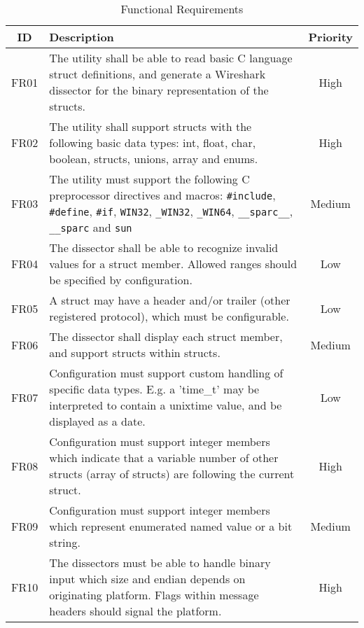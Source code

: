 \begin{table}[ht] \center
\caption{Functional Requirements\label{tab:funcreq}}
\begin{tabular}{| c | p{9cm} | c |}
	\hline ID & Description & Priority \\
    \hline FR01 & The utility shall be able to read basic C language struct
		definitions, and generate a Wireshark dissector for the binary
		representation of the structs. & High \\
	\hline FR02 & The utility shall support structs with the following basic
		data types: int, float, char, boolean, structs, unions, array and
		enums. & High \\
	\hline FR03 & The utility must support the following C preprocessor
		directives and macros: \verb+#include+, \verb+#define+, \verb+#if+,
		\verb+WIN32+, \verb+_WIN32+, \verb+_WIN64+, \verb+__sparc__+,
		\verb+__sparc+ and \verb+sun+ & Medium \\
	\hline FR04 & The dissector shall be able to recognize invalid values for
		a struct member. Allowed ranges should be specified by configuration.
		& Low \\
	\hline FR05 & A struct may have a header and/or trailer (other registered
		protocol), which must be configurable. & Low \\
	\hline FR06 & The dissector shall display each struct member, and support
		structs within structs. & Medium \\
	\hline FR07 & Configuration must support custom handling of
		specific data types. E.g. a 'time\_t' may be interpreted to contain a
		unixtime value, and be displayed as a date. & Low \\
	\hline FR08 & Configuration must support integer members which indicate
		that a variable number of other structs (array of structs) are
		following the current struct. & High \\
	\hline FR09 & Configuration must support integer members which represent
		enumerated named value or a bit string. & Medium \\
	\hline FR10 & The dissectors must be able to handle binary input which size
		and endian depends on originating platform. Flags within message
		headers should signal the platform. & High \\
	\hline
\end{tabular}
\end{table}

